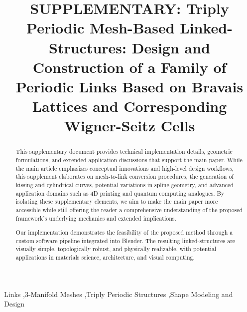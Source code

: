 \documentclass[times,twocolumn,final]{elsarticle}
\begin{document}

\begin{frontmatter}

\title{SUPPLEMENTARY: Triply Periodic Mesh-Based Linked-Structures: Design and Construction of a Family of Periodic Links Based on Bravais Lattices and Corresponding Wigner-Seitz Cells}





\received{\today}

\begin{abstract}
This supplementary document provides technical implementation details, geometric formulations, and extended application discussions that support the main paper. While the main article emphasizes conceptual innovations and high-level design workflows, this supplement elaborates on mesh-to-link conversion procedures, the generation of kissing and cylindrical curves, potential variations in spline geometry, and advanced application domains such as 4D printing and quantum computing analogues. By isolating these supplementary elements, we aim to make the main paper more accessible while still offering the reader a comprehensive understanding of the proposed framework's underlying mechanics and extended implications.

Our implementation demonstrates the feasibility of the proposed method through a custom software pipeline integrated into Blender. The resulting linked-structures are visually simple, topologically robust, and physically realizable, with potential applications in materials science, architecture, and visual computing.
\end{abstract}


\begin{keyword}
\KWD Links \sep 3-Manifold Meshes \sep Triply Periodic Structures \sep Shape Modeling and Design 
\end{keyword}

\end{frontmatter}
\end{document}
